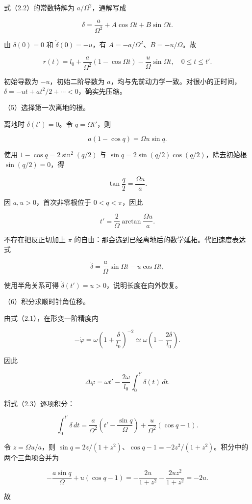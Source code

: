 \documentclass[12pt,a4paper,fontset=fandol]{ctexart}
\begin{document}
式（2.2）的常数特解为 \(a/\Omega^2\)，通解写成

\[
\delta=\frac{a}{\Omega^2}+A\cos\Omega t+B\sin\Omega t.
\]

由 \(\delta(0)=0\) 和 \(\dot\delta(0)=-u\)，有
\(A=-a/\Omega^2\)、\(B=-u/\Omega\)。故

\[
\boxed{r(t)=l_0+\frac{a}{\Omega^2}(1-\cos\Omega t)
-\frac{u}{\Omega}\sin\Omega t,\quad 0\le t\le t'.}
\tag{2.3}
\]

初始导数为 \(-u\)，初始二阶导数为
\(a\)，均与先前动力学一致。对很小的正时间，\(\delta=-ut+at^2/2+\cdots<0\)，确实先压缩。

（5）选择第一次离地的根。

离地时 \(\delta(t')=0\)。令 \(q=\Omega t'\)，则

\[
a(1-\cos q)=\Omega u\sin q.
\]

使用 \(1-\cos q=2\sin^2(q/2)\) 与
\(\sin q=2\sin(q/2)\cos(q/2)\)，除去初始根 \(\sin(q/2)=0\)，得

\[
\tan\frac q2=\frac{\Omega u}{a}.
\]

因 \(a,u>0\)，首次非零根位于 \(0<q<\pi\)，因此

\[
\boxed{t'=\frac{2}{\Omega}\arctan\frac{\Omega u}{a}.}
\tag{2.4}
\]

不存在把反正切加上 \(\pi\)
的自由：那会选到已经离地后的数学延拓。代回速度表达式

\[
\dot\delta=\frac a\Omega\sin\Omega t-u\cos\Omega t,
\]

使用半角关系可得 \(\dot\delta(t')=u>0\)，说明长度在向外恢复。

（6）积分求顺时针角位移。

由式（2.1），在形变一阶精度内

\[
-\dot\varphi=\omega\left(1+\frac{\delta}{l_0}\right)^{-2}
\simeq\omega\left(1-\frac{2\delta}{l_0}\right).
\]

因此

\[
\Delta\varphi=\omega t'-\frac{2\omega}{l_0}\int_0^{t'}\delta(t)\,dt.
\tag{2.5}
\]

将式（2.3）逐项积分：

\[
\int_0^{t'}\delta\,dt
=\frac{a}{\Omega^2}\left(t'-\frac{\sin q}{\Omega}\right)
+\frac{u}{\Omega^2}(\cos q-1).
\]

令 \(z=\Omega u/a\)，则
\(\sin q=2z/(1+z^2)\)、\(\cos q-1=-2z^2/(1+z^2)\)。积分中的两个三角项合并为

\[
-\frac{a\sin q}{\Omega}+u(\cos q-1)
=-\frac{2u}{1+z^2}-\frac{2uz^2}{1+z^2}=-2u.
\]

故
\end{document}
